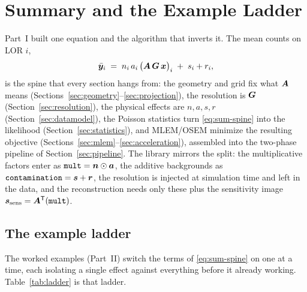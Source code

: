 \section{Summary and the Example Ladder}
\label{sec:summary}

Part~I built one equation and the algorithm that inverts it. The mean counts on
LOR $i$,
\begin{equation}
  \bar{\bm{y}}_i \;=\; n_i\,a_i\,\bigl(\bm{A}\,\bm{G}\,\bm{x}\bigr)_i \;+\; s_i + r_i ,
  \label{eq:sum-spine}
\end{equation}
is the spine that every section hangs from: the geometry and grid fix what $\bm{A}$
means (Sections~\ref{sec:geometry}--\ref{sec:projection}), the resolution is
$\bm{G}$ (Section~\ref{sec:resolution}), the physical effects are $n,a,s,r$
(Section~\ref{sec:datamodel}), the Poisson statistics turn \eqref{eq:sum-spine}
into the likelihood (Section~\ref{sec:statistics}), and MLEM/OSEM minimize the
resulting objective (Sections~\ref{sec:mlem}--\ref{sec:acceleration}), assembled
into the two-phase pipeline of Section~\ref{sec:pipeline}. The library mirrors the
split: the multiplicative factors enter as $\texttt{mult}=\bm{n}\odot\bm{a}$, the
additive backgrounds as $\texttt{contamination}=\bm{s}+\bm{r}$, the resolution is
injected at simulation time and left in the data, and the reconstruction needs
only these plus the sensitivity image $\bm{s}_{\mathrm{sens}}=\bm{A}^{\mathsf{T}}(\texttt{mult})$.

\subsection{The example ladder}
\label{sec:summary:ladder}

The worked examples (Part~II) switch the terms of \eqref{eq:sum-spine} on one at a
time, each isolating a single effect against everything before it already
working. Table~\ref{tab:ladder} is that ladder.

